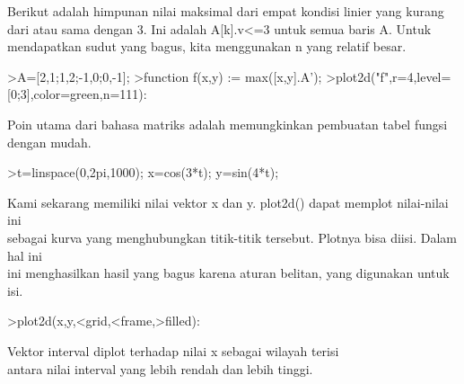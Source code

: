 \documentclass{article}
\begin{document}
\begin{eulernotebook}
\begin{eulercomment}
\begin{eulercomment}
\begin{eulercomment}
\begin{eulercomment}
\begin{eulercomment}
\begin{eulercomment}
\begin{eulercomment}
\begin{eulercomment}
\begin{eulercomment}
\begin{eulercomment}
\begin{eulercomment}
\begin{eulercomment}
\begin{eulerprompt}
\end{eulerprompt}
\begin{eulercomment}
Berikut adalah himpunan nilai maksimal dari empat kondisi linier yang
kurang dari atau sama dengan 3. Ini adalah A[k].v\textless{}=3 untuk semua baris
A. Untuk mendapatkan sudut yang bagus, kita menggunakan n yang relatif
besar.
\end{eulercomment}
\begin{eulerprompt}
>A=[2,1;1,2;-1,0;0,-1];
>function f(x,y) := max([x,y].A');
>plot2d("f",r=4,level=[0;3],color=green,n=111):
\end{eulerprompt}
\begin{eulercomment}
Poin utama dari bahasa matriks adalah memungkinkan pembuatan tabel
fungsi dengan mudah.
\end{eulercomment}
\begin{eulerprompt}
>t=linspace(0,2pi,1000); x=cos(3*t); y=sin(4*t);
\end{eulerprompt}
\begin{eulercomment}
Kami sekarang memiliki nilai vektor x dan y. plot2d() dapat memplot
nilai-nilai ini\\
sebagai kurva yang menghubungkan titik-titik tersebut. Plotnya bisa
diisi. Dalam hal ini\\
ini menghasilkan hasil yang bagus karena aturan belitan, yang
digunakan untuk\\
isi.
\end{eulercomment}
\begin{eulerprompt}
>plot2d(x,y,<grid,<frame,>filled):
\end{eulerprompt}
\begin{eulercomment}
Vektor interval diplot terhadap nilai x sebagai wilayah terisi\\
antara nilai interval yang lebih rendah dan lebih tinggi.


\end{eulercomment}
\end{eulercomment}
\end{eulercomment}
\end{eulercomment}
\end{eulercomment}
\end{eulercomment}
\end{eulercomment}
\end{eulercomment}
\end{eulercomment}
\end{eulercomment}
\end{eulercomment}
\end{eulercomment}
\end{eulercomment}
\end{eulernotebook}
\end{document}
